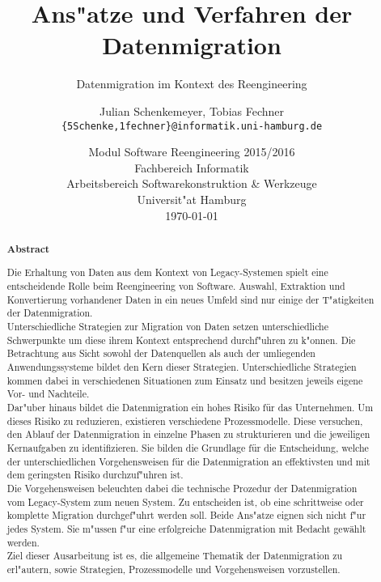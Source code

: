 \documentclass[11pt]{scrartcl}
\begin{document}
	
\title{Ans"atze und Verfahren der Datenmigration}

\subtitle{Datenmigration im Kontext des Reengineering} 

\author{Julian Schenkemeyer, Tobias Fechner\\
	{\texttt{\{5Schenke,1fechner\}@informatik.uni-hamburg.de}}}

\date{Modul Software Reengineering 2015/2016\\
  \small Fachbereich Informatik\\ 
  Arbeitsbereich Softwarekonstruktion \& Werkzeuge\\ 
  Universit"at Hamburg\\[4mm]
  \today}

\maketitle

\begin{abstract}
	\small\noindent\textbf{Abstract}

	\noindent Die Erhaltung von Daten aus dem Kontext von Legacy-Systemen spielt eine entscheidende Rolle beim Reengineering von Software. Auswahl, Extraktion und Konvertierung vorhandener Daten in ein neues Umfeld sind nur einige der T"atigkeiten der Datenmigration. \\
	Unterschiedliche Strategien zur Migration von Daten setzen unterschiedliche Schwerpunkte um diese ihrem Kontext entsprechend durchf"uhren zu k"onnen. Die Betrachtung aus Sicht sowohl der Datenquellen als auch der umliegenden Anwendungssysteme bildet den Kern dieser Strategien. Unterschiedliche Strategien kommen dabei in verschiedenen Situationen zum Einsatz und besitzen jeweils eigene Vor- und Nachteile. \\
	Dar"uber hinaus bildet die Datenmigration ein hohes Risiko für das Unternehmen. Um dieses Risiko zu reduzieren, existieren verschiedene Prozessmodelle. Diese versuchen, den Ablauf der Datenmigration in einzelne Phasen zu strukturieren und die jeweiligen Kernaufgaben zu identifizieren. Sie bilden die Grundlage für die Entscheidung, welche der unterschiedlichen Vorgehensweisen für die Datenmigration an effektivsten und mit dem geringsten Risiko durchzuf"uhren ist. \\
	Die Vorgehensweisen beleuchten dabei die technische Prozedur der Datenmigration vom Legacy-System zum neuen System. Zu entscheiden ist, ob eine schrittweise oder komplette Migration durchgef"uhrt werden soll. Beide Ans"atze eignen sich nicht f"ur jedes System. Sie m"ussen f"ur eine erfolgreiche Datenmigration mit Bedacht gewählt werden.\\
	Ziel dieser Ausarbeitung ist es, die allgemeine Thematik der Datenmigration zu erl"autern, sowie Strategien, Prozessmodelle und Vorgehensweisen vorzustellen.
\end{abstract}
\end{document}
